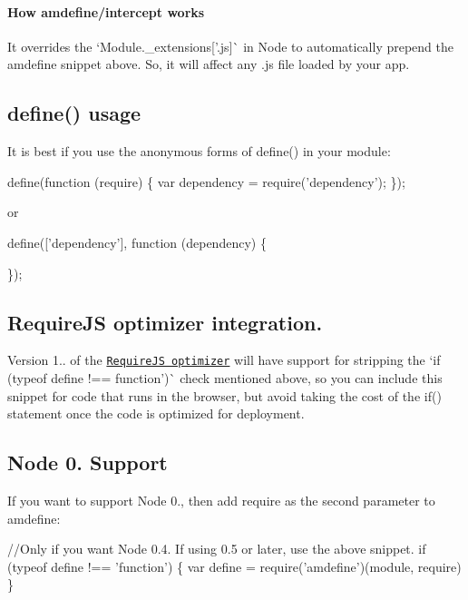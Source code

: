 \paragraph*{How amdefine/intercept works}

It overrides the `Module.\+\_\+extensions\mbox{[}'.js\textquotesingle{}\mbox{]}\`{} in Node to automatically prepend the amdefine snippet above. So, it will affect any .js file loaded by your app.

\subsection*{define() usage}

It is best if you use the anonymous forms of define() in your module\+:


\begin{DoxyCode}
define(function (require) \{
    var dependency = require('dependency');
\});
\end{DoxyCode}


or


\begin{DoxyCode}
define(['dependency'], function (dependency) \{

\});
\end{DoxyCode}


\subsection*{Require\+JS optimizer integration. \label{_optimizer}%
}

Version 1.. of the \href{http://requirejs.org/docs/optimization.html}{\tt Require\+JS optimizer} will have support for stripping the `if (typeof define !== \textquotesingle{}function')\`{} check mentioned above, so you can include this snippet for code that runs in the browser, but avoid taking the cost of the if() statement once the code is optimized for deployment.

\subsection*{Node 0. Support}

If you want to support Node 0., then add {\ttfamily require} as the second parameter to amdefine\+:


\begin{DoxyCode}
//Only if you want Node 0.4. If using 0.5 or later, use the above snippet.
if (typeof define !== 'function') \{ var define = require('amdefine')(module, require) \}
\end{DoxyCode}


